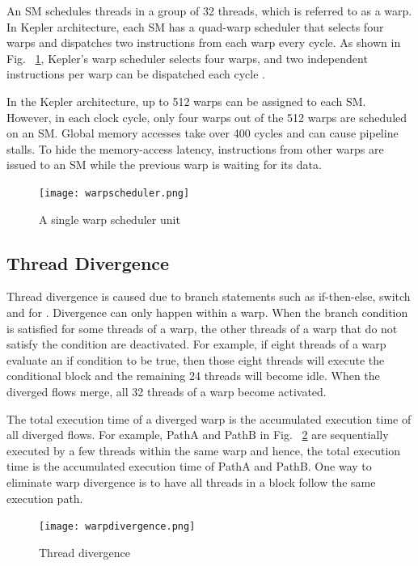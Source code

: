 An SM schedules threads in a group of 32 threads, which is referred to as a warp. In Kepler architecture, each SM has a quad-warp scheduler that selects four warps and dispatches two instructions from each warp every cycle.  As shown in Fig. ~\ref{fig:warpscheduler}, Kepler’s warp scheduler selects four warps, and two independent instructions per warp can be dispatched each cycle \cite{bib30}. 

In the Kepler architecture, up to 512 warps can be assigned to each SM. However, in each clock cycle, only four warps out of the 512 warps are scheduled on an SM. Global memory accesses take over 400 cycles and can cause pipeline stalls. To hide the memory-access latency, instructions from other warps are issued to an SM while the previous warp is waiting for its data.

\begin{figure}[H]
	\centering
	\texttt{[image: warpscheduler.png]}
	\caption{A single warp scheduler unit}
	\label{fig:warpscheduler}
\end{figure}
\squeezeup

\subsection{Thread Divergence}
Thread divergence is caused due to branch statements such as if-then-else, switch and for \cite{bib5}. Divergence can only happen within a warp. When the branch condition is satisfied for some threads of a warp, the other threads of a warp that do not satisfy the condition are deactivated. For example, if eight threads of a warp evaluate an if condition to be true, then those eight threads will execute the conditional block and the remaining 24 threads will become idle. When the diverged flows merge, all 32 threads of a warp become activated.

The total execution time of a diverged warp is the accumulated execution time of all diverged flows. For example, PathA and PathB in Fig. ~\ref{fig:warpdivergence} are sequentially executed by a few threads within the same warp and hence, the total execution time is the accumulated execution time of PathA and PathB. One way to eliminate warp divergence is to have all threads in a block follow the same execution path. 

\begin{figure}[H]
	\centering
	\texttt{[image: warpdivergence.png]}
	\caption{Thread divergence}
	\label{fig:warpdivergence}
\end{figure}
\squeezeup

